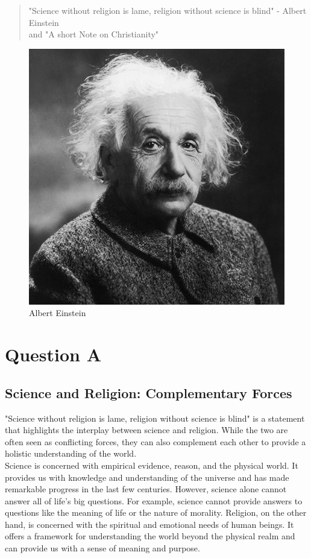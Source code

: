 \documentclass[11pt]{article}
\begin{document}
\tableofcontents
\thispagestyle{empty}
\clearpage

\setcounter{page}{1}

\begin{quotation}
	"Science without religion is lame, religion without science is blind" - Albert Einstein\\
	and "A short Note on Christianity"
\end{quotation}

\begin{figure}[H]
	\centering
	\includegraphics[width=.45\textwidth]{gettyimages-3091504.jpg}
	\caption{Albert Einstein}
\end{figure}

\section{Question A}

\subsection{Science and Religion: Complementary Forces}

"Science without religion is lame, religion without science is blind" is a statement that highlights the interplay between science and religion. While the two are often seen as conflicting forces, they can also complement each other to provide a holistic understanding of the world.\\

Science is concerned with empirical evidence, reason, and the physical world. It provides us with knowledge and understanding of the universe and has made remarkable progress in the last few centuries. However, science alone cannot answer all of life's big questions. For example, science cannot provide answers to questions like the meaning of life or the nature of morality. Religion, on the other hand, is concerned with the spiritual and emotional needs of human beings. It offers a framework for understanding the world beyond the physical realm and can provide us with a sense of meaning and purpose.\\
\end{document}
